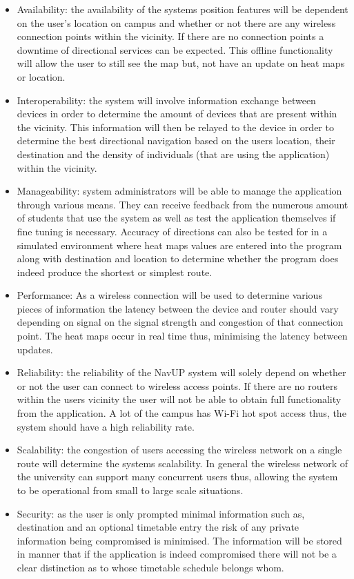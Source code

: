 \documentclass[11pt]{article}
\begin{document}
\begin{itemize}

\item Availability: the availability of the systems position features will be dependent on the user’s location on campus and whether or not there are any wireless connection points within the vicinity. If there are no connection points a downtime of directional services can be expected. This offline functionality will allow the user to still see the map but, not have an update on heat maps or location.  	
\item Interoperability: the system will involve information exchange between devices in order to determine the amount of devices that are present within the vicinity. This information will then be relayed to the device in order to determine the best directional navigation based on the users location, their destination and the density of individuals (that are using the application) within the vicinity.  
\item Manageability: system administrators will be able to manage the application through various means. They can receive feedback from the numerous amount of students that use the system as well as test the application themselves if fine tuning is necessary. Accuracy of directions can also be tested for in a simulated environment where heat maps values are entered into the program along with destination and location to determine whether the program does indeed produce the shortest or simplest route. 
\item Performance: As a wireless connection will be used to determine various pieces of information the latency between the device and router should vary depending on signal on the signal strength and congestion of that connection point. The heat maps occur in real time thus, minimising the latency between updates. 
\item Reliability: the reliability of the NavUP system will solely depend on whether or not the user can connect to wireless access points. If there are no routers within the users vicinity the user will not be able to obtain full functionality from the application. A lot of the campus has Wi-Fi hot spot access thus, the system should have a high reliability rate.  
\item Scalability: the congestion of users accessing the wireless network on a single route will determine the systems scalability. In general the wireless network of the university can support many concurrent users thus, allowing the system to be operational from small to large scale situations.  
\item Security: as the user is only prompted minimal information such as, destination and an optional timetable entry the risk of any private information being compromised is minimised. The information will be stored in manner that if the application is indeed compromised there will not be a clear distinction as to whose timetable schedule belongs whom.  

\end{itemize}
\end{document}
